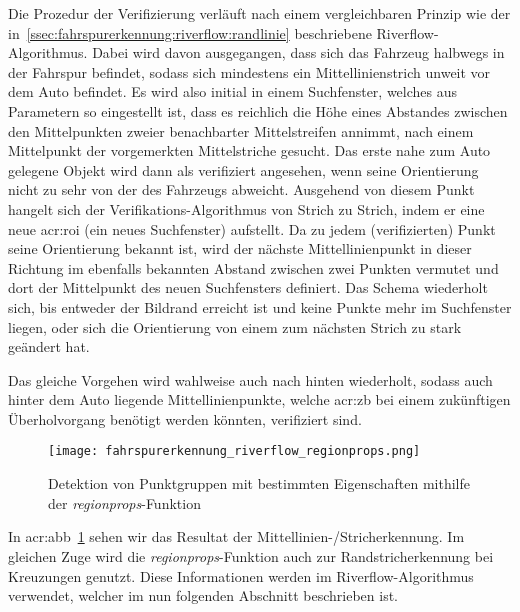 Die Prozedur der Verifizierung verläuft nach einem vergleichbaren Prinzip wie der in~\ref{ssec:fahrspurerkennung:riverflow:randlinie} beschriebene Riverflow-Algorithmus. Dabei wird davon ausgegangen, dass sich das Fahrzeug halbwegs in der Fahrspur befindet, sodass sich mindestens ein Mittellinienstrich unweit vor dem Auto befindet. Es wird also initial in einem  Suchfenster, welches aus Parametern so eingestellt ist, dass es reichlich die Höhe eines Abstandes zwischen den Mittelpunkten zweier benachbarter Mittelstreifen annimmt, nach einem Mittelpunkt der vorgemerkten Mittelstriche gesucht. Das erste nahe zum Auto gelegene Objekt wird dann als verifiziert angesehen, wenn seine Orientierung nicht zu sehr von der des Fahrzeugs abweicht. Ausgehend von diesem Punkt \glqq hangelt\grqq{} sich der Verifikations-Algorithmus von Strich zu Strich, indem er eine neue \gls{acr:roi} (ein neues Suchfenster) aufstellt. Da zu jedem (verifizierten) Punkt seine Orientierung bekannt ist, wird der nächste Mittellinienpunkt in dieser Richtung im ebenfalls bekannten Abstand zwischen zwei Punkten vermutet und dort der Mittelpunkt des neuen Suchfensters definiert. Das Schema wiederholt sich, bis entweder der Bildrand erreicht ist und keine Punkte mehr im Suchfenster liegen, oder sich die Orientierung von einem zum nächsten Strich zu stark geändert hat.

Das gleiche Vorgehen wird wahlweise auch nach hinten wiederholt, sodass auch hinter dem Auto liegende Mittellinienpunkte, welche \gls{acr:zb} bei einem zukünftigen Überholvorgang benötigt werden könnten, verifiziert sind.

\begin{figure}[H]
	\centering
	\texttt{[image: fahrspurerkennung\_riverflow\_regionprops.png]}
	\caption{Detektion von Punktgruppen mit bestimmten Eigenschaften mithilfe der \emph{regionprops}-Funktion}
	\label{fig:riverflow:mittellinie:regionprops}
\end{figure}

In \gls{acr:abb}~\ref{fig:riverflow:mittellinie:regionprops} sehen wir das Resultat der Mittellinien-/Stricherkennung. Im gleichen Zuge wird die \emph{regionprops}-Funktion auch zur Randstricherkennung bei Kreuzungen genutzt. Diese Informationen werden im Riverflow-Algorithmus verwendet, welcher im nun folgenden Abschnitt beschrieben ist.